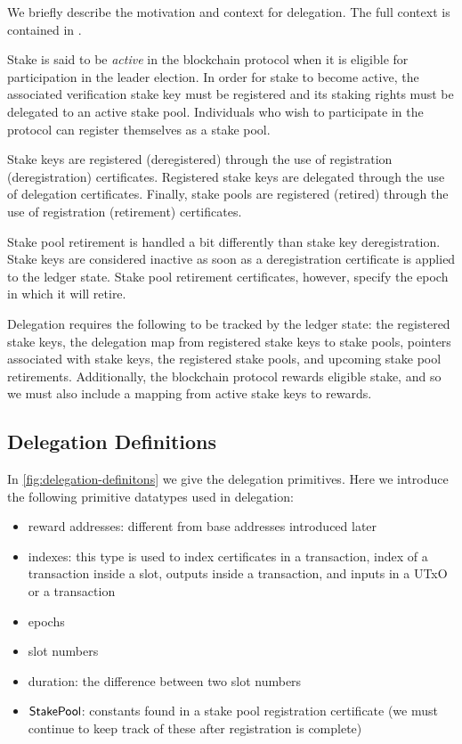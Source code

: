 
We briefly describe the motivation and context for delegation.
The full context is contained in \cite{delegation_design}.

Stake is said to be \textit{active} in the blockchain protocol
when it is eligible for participation in the leader election. In order for
stake to become active,
the associated verification stake key must be registered
and its staking rights must be delegated to an active stake pool.
Individuals who wish to participate in the protocol can
register themselves as a stake pool.

Stake keys are registered (deregistered) through the use of
registration (deregistration) certificates.
Registered stake keys are delegated through the use of delegation certificates.
Finally, stake pools are registered (retired) through the use of
registration (retirement) certificates.

Stake pool retirement is handled a bit differently than stake key deregistration.
Stake keys are considered inactive as soon as a deregistration certificate
is applied to the ledger state.
Stake pool retirement certificates, however, specify the epoch in
which it will retire.

Delegation requires the following to be tracked by the ledger state:
the registered stake keys, the delegation map from registered stake keys to stake
pools, pointers associated with stake keys,
the registered stake pools, and upcoming stake pool retirements.
Additionally, the blockchain protocol rewards eligible stake, and so we must
also include a mapping from active stake keys to rewards.

\subsection{Delegation Definitions}
\label{sec:deleg-defs}

In \cref{fig:delegation-definitons} we give the delegation primitives.
Here we introduce the following primitive datatypes used in delegation:

\begin{itemize}
\item reward addresses: different from base addresses introduced later
\item indexes: this type is used to index certificates in a transaction,
index of a transaction inside a slot, outputs inside a transaction,
and inputs in a UTxO or a transaction
\item epochs
\item slot numbers
\item duration: the difference between two slot numbers
\item $\mathsf{StakePool}$: constants found in a stake pool registration certificate
(we must continue to keep track of these after registration is complete)
\end{itemize}

